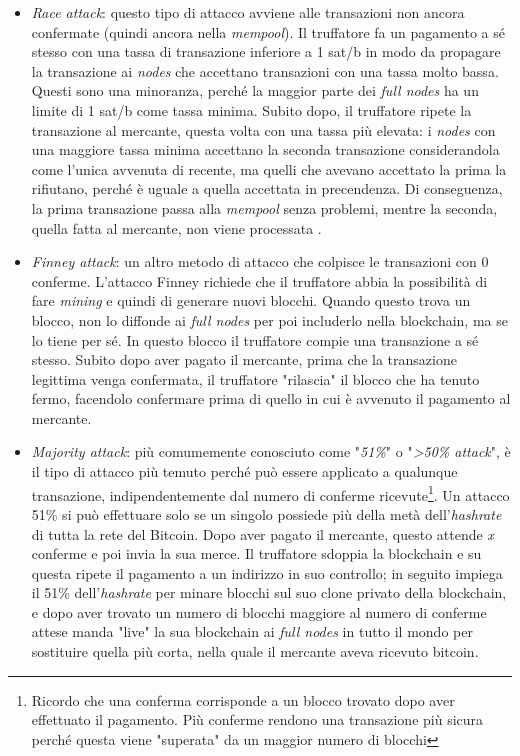 \documentclass {article}
\begin{document}
\begin{itemize}
\item \textit{Race attack}: questo tipo di attacco avviene alle transazioni non ancora confermate (quindi ancora nella \textit{mempool}).
Il truffatore fa un pagamento a sé stesso con una tassa di transazione inferiore a 1 sat/b in modo da propagare la transazione ai \textit{nodes} che accettano transazioni con una tassa molto bassa.
Questi sono una minoranza, perché la maggior parte dei \textit{full nodes} ha un limite di 1 sat/b come tassa minima.
Subito dopo, il truffatore ripete la transazione al mercante, questa volta con una tassa più elevata: i \textit{nodes} con una maggiore tassa minima accettano la seconda transazione considerandola come l'unica avvenuta di recente, ma quelli che avevano accettato la prima la rifiutano, perché è uguale a quella accettata in precendenza.
Di conseguenza, la prima transazione passa alla \textit{mempool} senza problemi, mentre la seconda, quella fatta al mercante, non viene processata \cite{raceattack}.
\item \textit{Finney attack}: un altro metodo di attacco che colpisce le transazioni con 0 conferme. L'attacco Finney richiede che il truffatore abbia la possibilità di fare \textit{mining} e quindi di generare nuovi blocchi.
Quando questo trova un blocco, non lo diffonde ai \textit{full nodes} per poi includerlo nella blockchain, ma se lo tiene per sé.
In questo blocco il truffatore compie una transazione a sé stesso.
Subito dopo aver pagato il mercante, prima che la transazione legittima venga confermata, il truffatore "rilascia" il blocco che ha tenuto fermo, facendolo confermare prima di quello in cui è avvenuto il pagamento al mercante.
\item \textit{Majority attack}: più comumemente conosciuto come "\textit{51\%}" o "\textit{>50\% attack}", è il tipo di attacco più temuto perché può essere applicato a qualunque transazione, indipendentemente dal numero di conferme ricevute\footnote{Ricordo che una conferma corrisponde a un blocco trovato dopo aver effettuato il pagamento.
Più conferme rendono una transazione più sicura perché questa viene "superata" da un maggior numero di blocchi}.
Un attacco 51\% si può effettuare solo se un singolo possiede più della metà dell'\textit{hashrate} di tutta la rete del Bitcoin.
Dopo aver pagato il mercante, questo attende \textit{x} conferme e poi invia la sua merce.
Il truffatore sdoppia la blockchain e su questa ripete il pagamento a un indirizzo in suo controllo; in seguito impiega il 51\% dell'\textit{hashrate} per minare blocchi sul suo clone privato della blockchain, e dopo aver trovato un numero di blocchi maggiore al numero di conferme attese manda "live" la sua blockchain ai \textit{full nodes} in tutto il mondo per sostituire quella più corta, nella quale il mercante aveva ricevuto bitcoin.
\end{itemize}
\end{document}
